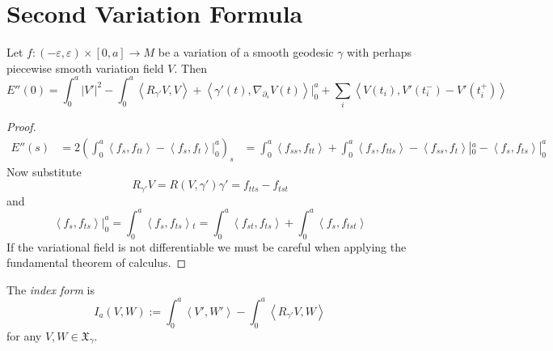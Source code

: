 \documentclass{book}
\begin{document}
\section{Second Variation Formula}
\label{section-second-variation}

\begin{theorem}
\label{theorem-second-variation-formula}
Let $f:(-\varepsilon,\varepsilon)\times[0,a]
\to M$ be a variation of a smooth
geodesic $\gamma$ with perhaps piecewise
smooth variation field $V$. Then
\begin{equation}
\label{equation-second-variation-formula}
E''(0)=\int_0^a |V'|^2-\int_0^a \left\langle{}R_{\gamma'}V,V\right\rangle{}+
\left\langle{}\gamma'(t),\nabla_{\partial_s}V(t)
\right\rangle{}|_{0}^a+
\sum_{i}\left\langle{}V(t_i),V'(t^-_i)-V'(t^+_i)
\right\rangle{}
\end{equation}
\end{theorem}

\begin{proof}
$$
\begin{aligned}
E''(s)&
=2\left(\int_0^a\left\langle{}f_s,f_{tt}\right\rangle{}-
\left\langle{}f_s,f_t\right\rangle{}|_{0}^a\right)_s
&=\int_0^a\left\langle{}f_{ss},f_{tt}\right\rangle{}+
\int_0^a\left\langle{}f_s,f_{t
ts}\right\rangle{}
-\left\langle{}f_{ss},f_t\right\rangle{}|_{0}^a-\left\langle{}f_s,
f_{ts}\right\rangle{}|_{0}^a
\end{aligned}
$$
Now substitute
$$
R_{\gamma'}V=R(V,\gamma')\gamma'=f_{t
ts}-f_{tst}
$$
and
$$
\left\langle{}f_s,f_{
ts}\right\rangle{}|_{0}^a=\int_0^a\left\langle{}f_s,f_{
ts}\right\rangle{}_t
=\int_0^a\left\langle{}f_{st},f_{ts}\right\rangle{}+
\int_0^a\left\langle{}f_s,f_{tst}\right\rangle{}
$$
If the variational field is not
differentiable we must be careful when
applying
the fundamental theorem of calculus.
\end{proof}

\begin{definition}
\label{definition-index-form}
The {\it index form} is
\begin{equation}
\label{equation-index-form}
I_a(V,W):=\int_0^a
\left\langle{}V',W'\right\rangle{}-\int_0^a\left\langle{}R_{\gamma'}V,
W\right\rangle{}
\end{equation}
for any $V,W \in \mathfrak{X}_\gamma$.
\end{definition}
\end{document}
